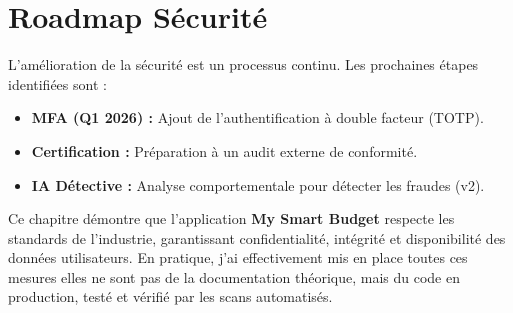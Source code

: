 \section{Roadmap Sécurité}

L'amélioration de la sécurité est un processus continu. Les prochaines étapes identifiées sont :

\begin{itemize}
    \item \textbf{MFA (Q1 2026) :} Ajout de l'authentification à double facteur (TOTP).
    \item \textbf{Certification :} Préparation à un audit externe de conformité.
    \item \textbf{IA Détective :} Analyse comportementale pour détecter les fraudes (v2).
\end{itemize}

Ce chapitre démontre que l'application \textbf{My Smart Budget} respecte les standards de l'industrie, garantissant confidentialité, intégrité et disponibilité des données utilisateurs. En pratique, j'ai effectivement mis en place toutes ces mesures  elles ne sont pas de la documentation théorique, mais du code en production, testé et vérifié par les scans automatisés.
